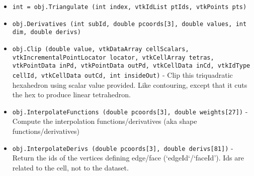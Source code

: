 \begin{itemize}
\item  \verb|int = obj.Triangulate (int index, vtkIdList ptIds, vtkPoints pts)|

\item  \verb|obj.Derivatives (int subId, double pcoords[3], double values, int dim, double derivs)|

\item  \verb|obj.Clip (double value, vtkDataArray cellScalars, vtkIncrementalPointLocator locator, vtkCellArray tetras, vtkPointData inPd, vtkPointData outPd, vtkCellData inCd, vtkIdType cellId, vtkCellData outCd, int insideOut)| -  Clip this triquadratic hexahedron using scalar value provided. Like
 contouring, except that it cuts the hex to produce linear
 tetrahedron.

\item  \verb|obj.InterpolateFunctions (double pcoords[3], double weights[27])| -  Compute the interpolation functions/derivatives
 (aka shape functions/derivatives)

\item  \verb|obj.InterpolateDerivs (double pcoords[3], double derivs[81])| -  Return the ids of the vertices defining edge/face (`edgeId`/`faceId').
 Ids are related to the cell, not to the dataset.

\end{itemize}

